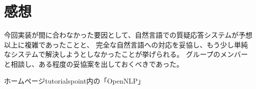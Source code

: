 \documentclass{jarticle}
\begin{document}
\section{感想}
    今回実装が間に合わなかった要因として、自然言語での質疑応答システムが予想以上に複雑であったことと、
    完全な自然言語への対応を妥協し、もう少し単純なシステムで解決しようとしなかったことが挙げられる。
    グループのメンバーと相談し、ある程度の妥協案を出しておくべきであった。

\begin{thebibliography}{99}
     ホームページtutorialspoint内の「OpenNLP」
\end{thebibliography}
\end{document}
